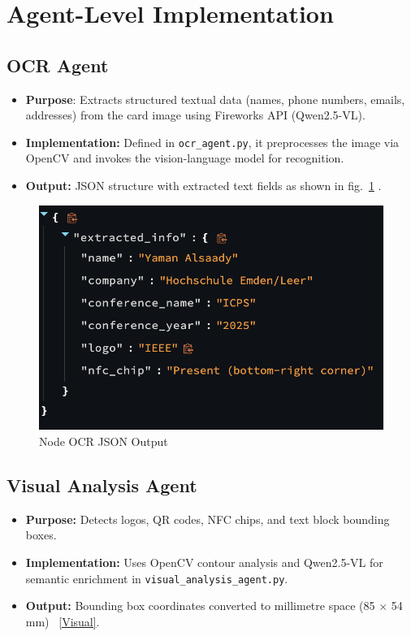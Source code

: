 \section{Agent-Level Implementation}

\subsection{OCR Agent}

 \begin{itemize}	
\item \textbf{Purpose}: Extracts structured textual data (names, phone numbers, emails, addresses) from the card image using Fireworks API (Qwen2.5-VL).
\item \textbf{Implementation:} Defined in \texttt{ocr\_agent.py}, it preprocesses the image via OpenCV and invokes the vision-language model for recognition.
\item \textbf{Output:} JSON structure with extracted text fields as shown in fig.~\ref{OCR} .
\end{itemize}

\begin{figure}
	\begin{center}
		\includegraphics[width=0.5\linewidth]{Images/ocr.png}
		\caption{Node OCR JSON Output}
		\label{OCR} 
	\end{center}
\end{figure}


\subsection{Visual Analysis Agent}
\begin{itemize}
	\item \textbf{Purpose:} Detects logos, QR codes, NFC chips, and text block bounding boxes.
	\item \textbf{Implementation:} Uses OpenCV contour analysis and Qwen2.5-VL for semantic enrichment in \texttt{visual\_analysis\_agent.py}.
	\item \textbf{Output:} Bounding box coordinates converted to millimetre space (85 $\times$ 54 mm) ~\ref{Visual}.
\end{itemize}


